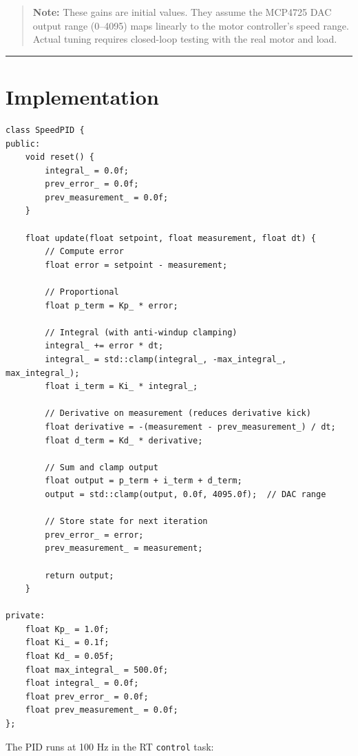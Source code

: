 \documentclass[12pt,a4paper,oneside]{report}
\begin{document}
\begin{quote}
\textbf{Note:} These gains are initial values. They assume the MCP4725 DAC
output range (0--4095) maps linearly to the motor controller's speed range.
Actual tuning requires closed-loop testing with the real motor and load.
\end{quote}

\begin{center}\rule{0.5\linewidth}{0.5pt}\end{center}

\section{Implementation}\label{implementation}

\begin{verbatim}
class SpeedPID {
public:
    void reset() {
        integral_ = 0.0f;
        prev_error_ = 0.0f;
        prev_measurement_ = 0.0f;
    }

    float update(float setpoint, float measurement, float dt) {
        // Compute error
        float error = setpoint - measurement;

        // Proportional
        float p_term = Kp_ * error;

        // Integral (with anti-windup clamping)
        integral_ += error * dt;
        integral_ = std::clamp(integral_, -max_integral_, max_integral_);
        float i_term = Ki_ * integral_;

        // Derivative on measurement (reduces derivative kick)
        float derivative = -(measurement - prev_measurement_) / dt;
        float d_term = Kd_ * derivative;

        // Sum and clamp output
        float output = p_term + i_term + d_term;
        output = std::clamp(output, 0.0f, 4095.0f);  // DAC range

        // Store state for next iteration
        prev_error_ = error;
        prev_measurement_ = measurement;

        return output;
    }

private:
    float Kp_ = 1.0f;
    float Ki_ = 0.1f;
    float Kd_ = 0.05f;
    float max_integral_ = 500.0f;
    float integral_ = 0.0f;
    float prev_error_ = 0.0f;
    float prev_measurement_ = 0.0f;
};
\end{verbatim}

The PID runs at 100 Hz in the RT \texttt{control} task:
\end{document}
